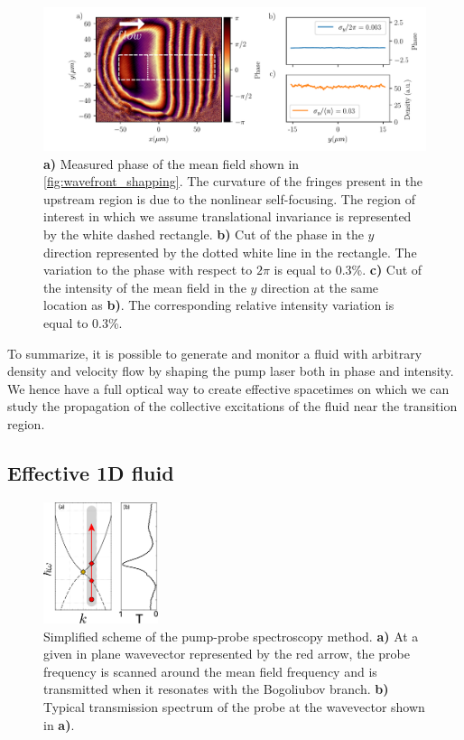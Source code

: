 \begin{figure}[t!]
    \centering
    \includegraphics[width=1\textwidth]{chap_custom_st/fig/phase_example.pdf}
    \caption{\textbf{a)} Measured phase of the mean field shown in \autoref{fig:wavefront_shapping}. The curvature of the fringes present in the upstream region is due to the nonlinear self-focusing. The region
    of interest in which we assume translational invariance is represented by the white dashed rectangle. \textbf{b)}  Cut of the phase in the $y$ direction represented by the dotted white line in the rectangle. The variation to the phase with respect
    to $2\pi$ is equal to 0.3\%. \textbf{c)} Cut of the intensity of the mean field in the $y$ direction at the same location as \textbf{b)}. The corresponding relative intensity variation is equal to 0.3\%.}
    \label{fig:phase_example}
\end{figure}



To summarize, it is possible to generate and monitor a fluid with arbitrary density and velocity flow by shaping the pump laser both in phase and intensity. We hence have a full optical way to create
effective spacetimes on which we can study the propagation of the collective excitations of the fluid near the transition region.

\subsection{Effective 1D fluid}

\begin{figure}[h]
    \centering
    \includegraphics[width=0.3\textwidth]{chap_custom_st/fig/setup_bogoliubov.pdf}
    \caption{Simplified scheme of the pump-probe spectroscopy method. \textbf{a)} At a given in plane wavevector represented by the red arrow, the probe frequency is scanned around the mean field frequency and is transmitted when it resonates with the Bogoliubov branch. \textbf{b)} Typical transmission spectrum of the probe at the wavevector shown in \textbf{a)}.}
    \label{fig:setup_bogo}
\end{figure}

